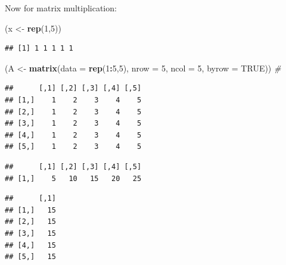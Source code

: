 \documentclass[]{book}
\newenvironment{Shaded}{\begin{snugshade}}{\end{snugshade}}
\newcommand{\CommentTok}[1]{\textcolor[rgb]{0.56,0.35,0.01}{\textit{#1}}}
\newcommand{\DataTypeTok}[1]{\textcolor[rgb]{0.13,0.29,0.53}{#1}}
\newcommand{\DecValTok}[1]{\textcolor[rgb]{0.00,0.00,0.81}{#1}}
\newcommand{\KeywordTok}[1]{\textcolor[rgb]{0.13,0.29,0.53}{\textbf{#1}}}
\newcommand{\NormalTok}[1]{#1}
\newcommand{\OperatorTok}[1]{\textcolor[rgb]{0.81,0.36,0.00}{\textbf{#1}}}
\newcommand{\OtherTok}[1]{\textcolor[rgb]{0.56,0.35,0.01}{#1}}
\newcommand{\StringTok}[1]{\textcolor[rgb]{0.31,0.60,0.02}{#1}}
\theoremstyle{definition}
\theoremstyle{definition}
\theoremstyle{definition}
\theoremstyle{remark}
\begin{document}
Now for matrix multiplication:

\begin{Shaded}
\begin{Highlighting}[]
\NormalTok{(x <-}\StringTok{ }\KeywordTok{rep}\NormalTok{(}\DecValTok{1}\NormalTok{,}\DecValTok{5}\NormalTok{))}
\end{Highlighting}
\end{Shaded}

\begin{verbatim}
## [1] 1 1 1 1 1
\end{verbatim}

\begin{Shaded}
\begin{Highlighting}[]
\NormalTok{(A <-}\StringTok{ }\KeywordTok{matrix}\NormalTok{(}\DataTypeTok{data =} \KeywordTok{rep}\NormalTok{(}\DecValTok{1}\OperatorTok{:}\DecValTok{5}\NormalTok{,}\DecValTok{5}\NormalTok{), }\DataTypeTok{nrow =} \DecValTok{5}\NormalTok{, }\DataTypeTok{ncol =} \DecValTok{5}\NormalTok{, }\DataTypeTok{byrow =} \OtherTok{TRUE}\NormalTok{)) }\CommentTok{# }
\end{Highlighting}
\end{Shaded}

\begin{verbatim}
##      [,1] [,2] [,3] [,4] [,5]
## [1,]    1    2    3    4    5
## [2,]    1    2    3    4    5
## [3,]    1    2    3    4    5
## [4,]    1    2    3    4    5
## [5,]    1    2    3    4    5
\end{verbatim}

\begin{Shaded}
\end{Shaded}

\begin{verbatim}
##      [,1] [,2] [,3] [,4] [,5]
## [1,]    5   10   15   20   25
\end{verbatim}

\begin{Shaded}
\end{Shaded}

\begin{verbatim}
##      [,1]
## [1,]   15
## [2,]   15
## [3,]   15
## [4,]   15
## [5,]   15
\end{verbatim}
\end{document}

